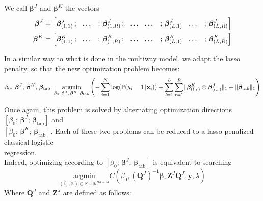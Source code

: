 \documentclass[10pt]{article}
\begin{document}
We call $\bm{\beta}^J$ and $\bm{\beta}^K$ the vectors
\begin{align}
    \bm{\beta}^J &= \left[ \bm{\beta}_{(1,1)}^J\, ; \hspace{7 pt} \hdots \hspace{7 pt} \, ; \, \bm{\beta}_{(1,R)}^J \,;    \hspace{7 pt} \hdots \hspace{7 pt}  \hdots \hspace{7 pt} \, ; \,  \bm{\beta}_{(L,1)}^J   \hspace{7 pt} \hdots \hspace{7 pt}  \, ;\,\bm{\beta}_{(L,R)}^J   \right]\\
    \bm{\beta}^K &= \left[ \bm{\beta}_{(1,1)}^K\, ; \hspace{7 pt} \hdots \hspace{7 pt} \, ; \, \bm{\beta}_{(1,R)}^K \,;    \hspace{7 pt} \hdots \hspace{7 pt}  \hdots \hspace{7 pt} \, ; \,  \bm{\beta}_{(L,1)}^K   \hspace{7 pt} \hdots \hspace{7 pt}  \, ;\,\bm{\beta}_{(L,R)}^K   \right]
\end{align}

\noindent In a similar way to what is done in the multiway model, we adapt the lasso penalty, so that the new optimization problem becomes:
\begin{equation}
    \beta_0 ,\, \bm{\beta}^J, \, \bm{\beta}^K, \, \bm{\beta}_{\text{tab}} = \hspace{- 8 pt} \underset{\beta_0 ,\, \bm{\beta}^J, \, \bm{\beta}^K, \, \bm{\beta}_{\text{tab}}}{\text{argmin}} \left(  - \sum\limits_{i = 1}^{N} \log(\mathbb{P}(y_i = 1 \, | \mathbf{x}_i)) + \sum\limits_{l = 1}^L \sum\limits_{r = 1}^R 
    \lVert \bm{\beta}_{(l,r)}^K \otimes \bm{\beta}_{(l,r)}^J \rVert_1 + \lVert \bm{\beta}_{\text{tab}} \rVert_1 \right)
\end{equation}

\noindent Once again, this problem is solved by alternating optimization directions $\left[ \beta_0 ;\, \bm{\beta}^J ;\,  \bm{\beta}_{\text{tab}} \right]$ and\\
$\left[ \beta_0 ;\, \bm{\beta}^K ;\,  \bm{\beta}_{\text{tab}} \right]$. Each of these two problems can be reduced to a lasso-penalized classical logistic\\[3 pt]
 regression.\\
Indeed, optimizing according to $\left[ \beta_0 ;\, \bm{\beta}^J ;\,  \bm{\beta}_{\text{tab}} \right]$ is equivalent to searching
\begin{equation}
\underset{(\beta_0, \bm{\beta}) \in \mathbb{R} \times \mathbb{R}^{RJ + M}}{\text{argmin}}  C(\beta_0, (\mathbf{Q}^J)^{-1}\bm{\beta},\mathbf{Z}^J \mathbf{Q}^J, \mathbf{y}, \lambda) 
\end{equation}
Where $\mathbf{Q}^J$ and $\mathbf{Z}^J$ are defined as follows:
\end{document}
